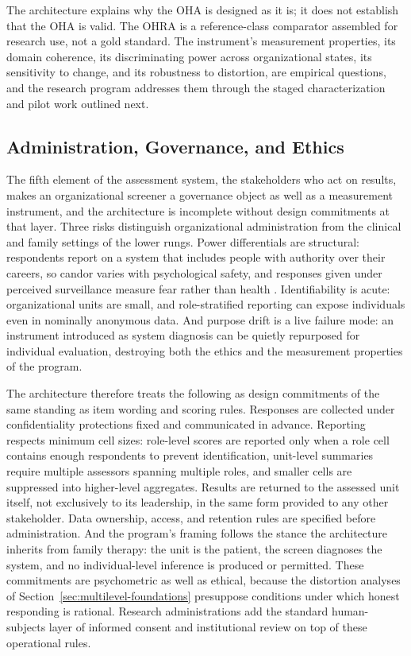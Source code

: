 \documentclass[12pt, letterpaper]{article}
\begin{document}
The architecture explains why the OHA is designed as it is; it does not establish that the OHA is valid. The OHRA is a reference-class comparator assembled for research use, not a gold standard. The instrument's measurement properties, its domain coherence, its discriminating power across organizational states, its sensitivity to change, and its robustness to distortion, are empirical questions, and the research program addresses them through the staged characterization and pilot work outlined next.

\subsection{Administration, Governance, and Ethics}
\label{sec:governance}

The fifth element of the assessment system, the stakeholders who act on results, makes an organizational screener a governance object as well as a measurement instrument, and the architecture is incomplete without design commitments at that layer. Three risks distinguish organizational administration from the clinical and family settings of the lower rungs. Power differentials are structural: respondents report on a system that includes people with authority over their careers, so candor varies with psychological safety, and responses given under perceived surveillance measure fear rather than health \parencite{edmondson1999,paulhus1984}. Identifiability is acute: organizational units are small, and role-stratified reporting can expose individuals even in nominally anonymous data. And purpose drift is a live failure mode: an instrument introduced as system diagnosis can be quietly repurposed for individual evaluation, destroying both the ethics and the measurement properties of the program.

The architecture therefore treats the following as design commitments of the same standing as item wording and scoring rules. Responses are collected under confidentiality protections fixed and communicated in advance. Reporting respects minimum cell sizes: role-level scores are reported only when a role cell contains enough respondents to prevent identification, unit-level summaries require multiple assessors spanning multiple roles, and smaller cells are suppressed into higher-level aggregates. Results are returned to the assessed unit itself, not exclusively to its leadership, in the same form provided to any other stakeholder. Data ownership, access, and retention rules are specified before administration. And the program's framing follows the stance the architecture inherits from family therapy: the unit is the patient, the screen diagnoses the system, and no individual-level inference is produced or permitted. These commitments are psychometric as well as ethical, because the distortion analyses of Section~\ref{sec:multilevel-foundations} presuppose conditions under which honest responding is rational. Research administrations add the standard human-subjects layer of informed consent and institutional review on top of these operational rules.
\end{document}
